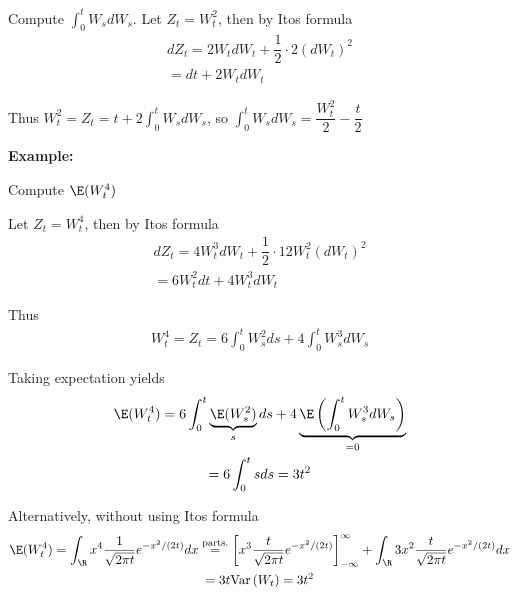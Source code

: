 \noindent Compute $\int_{0}^{t}W_sdW_s$. Let $Z_t = W_t^2$, then by Itos formula
\begin{equation*}
  \begin{gathered}
    dZ_t = 2W_tdW_t + \dfrac{1}{2}\cdot2(dW_t)^2\\
    = dt+2W_tdW_t
  \end{gathered}
\end{equation*}\par
\noindent Thus $W_t^2 = Z_t = t+2\int_{0}^{t}W_sdW_s$, so $\int_{0}^{t}W_sdW_s = \dfrac{W_t^2}{2}-\dfrac{t}{2}$
\par\bigskip
\noindent\textbf{Example:}\par
\noindent Compute $\E(W_t^4)$\par
\noindent Let $Z_t = W_t^4$, then by Itos formula
\begin{equation*}
  \begin{gathered}
    dZ_t = 4W_t^3dW_t + \dfrac{1}{2}\cdot12W_t^2(dW_t)^2\\
    = 6W_t^2dt+4W_t^3dW_t
  \end{gathered}
\end{equation*}\par
\noindent Thus
\begin{equation*}
  \begin{gathered}
    W_t^4 = Z_t = 6\int_{0}^{t}W_s^2ds+4\int_{0}^{t}W_s^3dW_s
  \end{gathered}
\end{equation*}\par
\noindent Taking expectation yields
\begin{equation*}
  \begin{gathered}
    \E(W_t^4) = 6\int_{0}^{t}\underbrace{\E(W_s^2)}_{s}ds+4\underbrace{\E\left(\int_{0}^{t}W_s^3dW_s\right)}_{=0}\\
    = 6\int_{0}^{t}sds = 3t^2
  \end{gathered}
\end{equation*}
\par\bigskip
\noindent Alternatively, without using Itos formula
\begin{equation*}
  \begin{gathered}
    \E(W_t^4) = \int_\R x^4\dfrac{1}{\sqrt{2\pi t}}e^{-x^2/(2t)}dx\stackrel{\text{parts.}}{=}\left[x^3\dfrac{t}{\sqrt{2\pi t}}e^{-x^2/(2t)}\right]_{-\infty}^\infty + \int_\R 3x^2\dfrac{t}{\sqrt{2\pi t}}e^{-x^2/(2t)}dx\\
    = 3t\text{Var}\left(W_t\right) = 3t^2
  \end{gathered}
\end{equation*}
